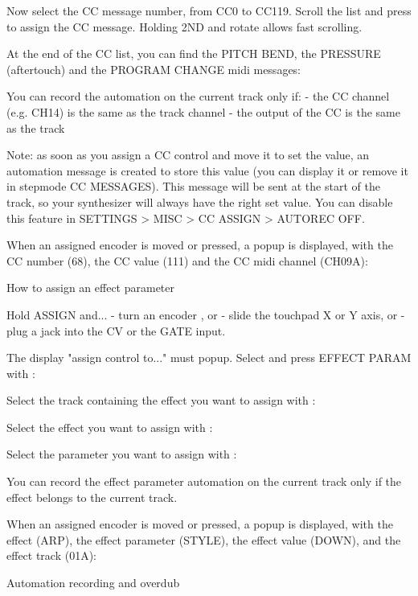  

Now select the CC message number, from CC0 to CC119. Scroll the list and press   to assign the CC message. Holding  2ND  and rotate  allows fast scrolling.

 

At the end of the CC list, you can find the PITCH BEND, the PRESSURE (aftertouch) and the PROGRAM CHANGE midi messages:

 

You can record the automation on the current track only if:
- the CC channel (e.g. CH14) is the same as the track channel
- the output of the CC is the same as the track

Note: as soon as you assign a CC control and move it to set the value, an automation message is created to store this value (you can display it or remove it in stepmode CC MESSAGES). This message will be sent at the start of the track, so your synthesizer will always have the right set value. You can disable this feature in SETTINGS > MISC > CC ASSIGN > AUTOREC OFF.

When an assigned encoder is moved or pressed, a popup is displayed, with the CC number (68), the CC value (111) and the CC midi channel (CH09A):



How to assign an effect parameter

Hold ASSIGN and...
- turn an encoder , or
- slide the touchpad  X or Y axis, or
- plug a jack into the CV or the GATE input.

The display "assign control to..." must popup. Select and press EFFECT PARAM with : 

 

Select the track containing the effect you want to assign with : 

 

Select the effect you want to assign with : 

 

Select the parameter you want to assign with : 

 

You can record the effect parameter automation on the current track only if the effect belongs to the current track.

When an assigned encoder is moved or pressed, a popup is displayed, with the effect (ARP), the effect parameter (STYLE), the effect value (DOWN), and the effect track (01A):



Automation recording and overdub

